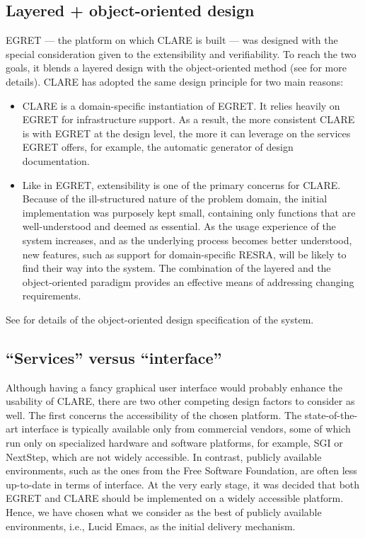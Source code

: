 \subsection{Layered + object-oriented design}
\label{sec:oo design}

EGRET --- the platform on which CLARE is built --- was designed with the
special consideration given to the extensibility and verifiability. To
reach the two goals, it blends a layered design with the object-oriented
method (see \cite{csdl-93-02} for more details). CLARE has adopted the same
design principle for two main reasons:

\begin{itemize}
\item CLARE is a domain-specific instantiation of EGRET.  It relies
  heavily on EGRET for infrastructure support. As a result, the more
  consistent CLARE is with EGRET at the design level, the more it can
  leverage on the services EGRET offers, for example, the automatic
  generator of design documentation.
  
\item Like in EGRET, extensibility is one of the primary concerns for
  CLARE.  Because of the ill-structured nature of the problem domain, the
  initial implementation was purposely kept small, containing only
  functions that are well-understood and deemed as essential. As the usage
  experience of the system increases, and as the underlying process becomes
  better understood, new features, such as support for domain-specific
  RESRA, will be likely to find their way into the system.  The combination
  of the layered and the object-oriented paradigm provides an effective
  means of addressing changing requirements.
\end{itemize}

See \cite{csdl-93-24} for details of the object-oriented design
specification of the system.


\subsection{``Services'' versus ``interface''}
\label{sec:service versus interface}

Although having a fancy graphical user interface would probably enhance the
usability of CLARE, there are two other competing design factors to
consider as well.  The first concerns the accessibility of the chosen
platform.  The state-of-the-art interface is typically available only from
commercial vendors, some of which run only on specialized hardware and
software platforms, for example, SGI or NextStep, which are not widely
accessible.  In contrast, publicly available environments, such as the ones
from the Free Software Foundation, are often less up-to-date in terms of
interface. At the very early stage, it was decided that both EGRET and
CLARE should be implemented on a widely accessible platform. Hence, we have
chosen what we consider as the best of publicly available environments,
i.e., {\sf Lucid Emacs}, as the initial delivery mechanism.

